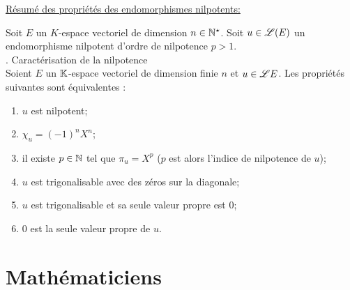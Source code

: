 \documentclass[
	a4paper, %
	fontsize=8pt, %
	twoside=true, %
	chapterentrydots=true, %
	numbers=noenddot, %
]{kaobook}
\begin{document}
\underline{Résumé des propriétés des endomorphismes nilpotents:}

Soit $E$ un $K$-espace vectoriel de dimension $n \in \mathbb{N}^\star$. Soit $u \in \mathscr{L}(E)$ un endomorphisme nilpotent d'ordre de nilpotence $p > 1$. \\
\cite{objectif_agregation}. Caractérisation de la nilpotence \\
Soient $E$ un $\mathbb{K}$-espace vectoriel de dimension finie $n$ et $u \in \mathscr{L}{E}$. Les propriétés suivantes sont équivalentes :
\begin{enumerate}[label=(\roman*)]
    \item $u$ est nilpotent;
    \item $\chi_u = (-1)^n X^n$;
    \item il existe $p \in \mathbb{N}$ tel que $\pi_u = X^p$ ($p$ est alors l'indice de nilpotence de $u$);
    \item $u$ est trigonalisable avec des zéros sur la diagonale;
    \item $u$ est trigonalisable et sa seule valeur propre est $0$;
    \item $0$ est la seule valeur propre de $u$.
\end{enumerate}

\backmatter %

\thispagestyle{empty}
\chapter{Mathématiciens}
\begin{multicols}{2}
\small
\begin{itemize}
    
\end{itemize}
\end{multicols}

\printbibliography[heading=bibintoc, title=Références] %

\printindex %
\end{document}

